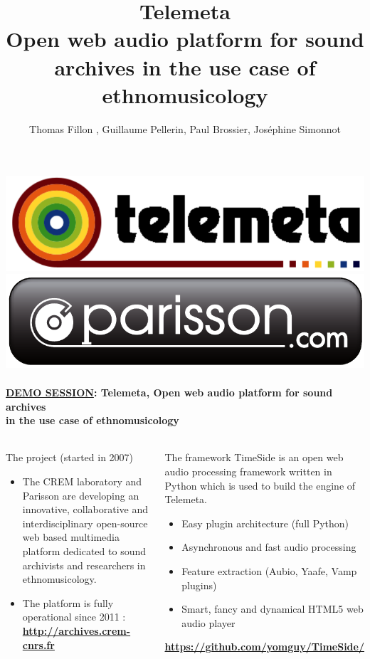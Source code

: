 \documentclass[final, hyperref, table]{beamer} \mode<presentation>
\title[TELEMETA, audio web CMS for Ethnomusicological
archives]{Telemeta\\Open web audio platform for sound archives in the
  use case of ethnomusicology}
\author[Fillon, Pellerin, Brossier, Simonnot]{Thomas Fillon
  \inst{1,2}, Guillaume Pellerin\inst{1}, Paul Brossier\inst{1},
  Jos{\'e}phine Simonnot\inst{3}}
\begin{document}
\setlength{\leftmargini}{10pt} \thispagestyle{empty}
\begin{frame}\tiny
  \frametitle{\includegraphics[width=0.3\linewidth]{logo_telemeta_alpha_black.png}
    \hspace{.4\linewidth} \includegraphics[width=.3\linewidth]{../poster/img/parisson_logo_FINALE_com.pdf}}
  \framesubtitle{{\underline{DEMO SESSION}}: \textbf{Telemeta, Open web audio platform for sound archives\\
      \hspace{2.7cm}in the use case of ethnomusicology}}
  
  \vspace{-0.2cm}
  \begin{columns}

    \column[t]{5.3cm}

    \begin{block}{The project {\tiny(started in 2007)}}
      \begin{itemize}
      \item The CREM laboratory and Parisson are developing an
        innovative, collaborative and interdisciplinary
        \alert{open-source web based multimedia platform} dedicated to
        \alert{sound archivists} and \alert{researchers in
          ethnomusicology}.
      \item The platform is fully operational since 2011 :
        \colorbox{yellow!50} {\bf \url{http://archives.crem-cnrs.fr}}
      \end{itemize}
    \end{block}
    \vspace{-0.2cm}
    \begin{block}{The framework}
      TimeSide is an \alert{open web audio processing framework} written in
      Python which is used to build the engine of Telemeta.
      \begin{itemize}
      \item Easy plugin architecture (full \alert{Python})
      \item Asynchronous and fast audio processing
      \item \alert{Feature extraction} (Aubio, Yaafe, Vamp plugins)
      \item Smart, fancy and dynamical \alert{HTML5 web audio player}
      \end{itemize}
      \vspace{-0.5cm}
      \begin{center}
        \colorbox{yellow!50}{\bf
          \url{https://github.com/yomguy/TimeSide/}}
      \end{center}


\end{block}
\end{columns}
\end{frame}
\end{document}

